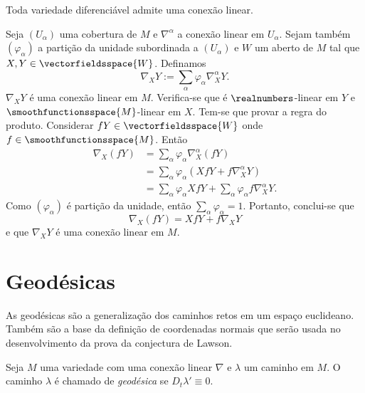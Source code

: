\begin{proposicao}
	Toda variedade diferenciável admite uma conexão linear.
\end{proposicao}

\begin{demonstracao}
	Seja $(U_{\alpha})$ uma cobertura de $M$ e $\nabla^{\alpha}$ a conexão linear em $U_{\alpha}$. Sejam também $(\varphi_{\alpha})$ a partição da unidade subordinada a $(U_{\alpha})$ e $W$ um aberto de $M$ tal que $X,Y \in \vectorfieldsspace{W}$. Definamos
	\begin{equation*}
		\nabla_X Y := \sum_{\alpha} \varphi_{\alpha} \nabla_X^{\alpha} Y.
	\end{equation*}
	$\nabla_X Y$ é uma conexão linear em $M$. Verifica-se que é $\realnumbers$-linear em $Y$ e $\smoothfunctionsspace{M}$-linear em $X$. Tem-se que provar a regra do produto. Considerar $fY \in \vectorfieldsspace{W}$ onde $f \in \smoothfunctionsspace{M}$. Então
	\begin{align*}
		\nabla_X (fY) &= \sum_{\alpha} \varphi_{\alpha} \nabla_X^{\alpha} (fY)\\
		&= \sum_{\alpha} \varphi_{\alpha} (Xf Y + f \nabla_X^{\alpha} Y)\\
		&= \sum_{\alpha} \varphi_{\alpha} X f Y + \sum_{\alpha} \varphi_{\alpha} f \nabla_X^{\alpha} Y. 
	\end{align*}
	Como $(\varphi_{\alpha})$ é partição da unidade, então $\sum_{\alpha} \varphi_{\alpha} = 1$. Portanto, conclui-se que
	\begin{equation*}
		\nabla_X (fY) = X f Y + f \nabla_X Y
	\end{equation*}
	e que $\nabla_X Y$ é uma conexão linear em $M$.
\end{demonstracao}

\section{Geodésicas}

As geodésicas são a generalização dos caminhos retos em um espaço euclideano.
Também são a base da definição de coordenadas normais que serão usada no desenvolvimento da prova da conjectura de Lawson.

\begin{definicao}
	Seja $M$ uma variedade com uma conexão linear $\nabla$ e
	$\lambda$ um caminho em $M$.
	O caminho $\lambda$ é chamado de \emph{geodésica} se $D_t \lambda' \equiv 0$.
\end{definicao}

